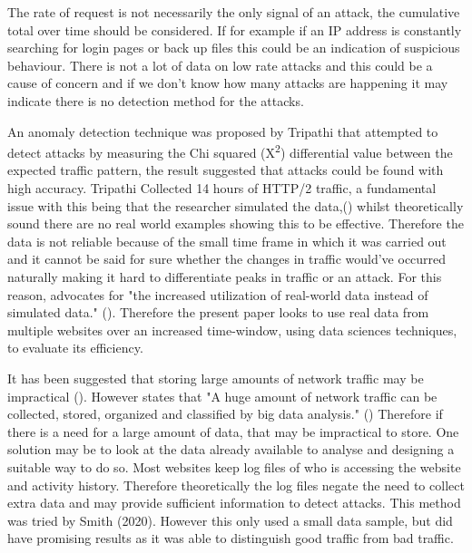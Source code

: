 The rate of request is not necessarily the only signal of an attack, the cumulative total over time should be considered. If for example if an IP address is constantly searching for login pages or back up files this could be an indication of suspicious behaviour. There is not a lot of data on low rate attacks and this could be a cause of concern and if we don't know how many attacks are happening it may indicate there is no detection method for the attacks. 

 
An anomaly detection technique was proposed by Tripathi that attempted to detect attacks by measuring the Chi squared (X\textsuperscript{\small2}) differential value between the expected traffic pattern, the result suggested that attacks could be found with high accuracy. Tripathi Collected 14 hours of HTTP/2 traffic, a fundamental issue with this being that the researcher simulated the data,(\cite{tripathi2018slow}) whilst theoretically sound there are no real world examples showing this to be effective. Therefore the data is not reliable because of the small time frame in which it was carried out and  it cannot be said for sure whether the changes in traffic would've occurred naturally making it hard to differentiate peaks in traffic or an attack. For this reason, \citeauthor{8500383} advocates for "the increased utilization of real-world data instead of simulated data." (\cite{8500383}). Therefore the present paper looks to use real data from multiple websites over an increased time-window, using data sciences techniques, to evaluate its efficiency. 

It has been suggested that storing large amounts of network traffic may be impractical (\cite{staniford2002practical}). However \citeauthor{9016229} states that  "A huge amount of network traffic can be collected, stored, organized and classified by big data analysis." (\cite{9016229}) Therefore if there is a need for a large amount of data, that may be impractical to store. One solution may be to look at the data already available to analyse and designing a suitable way to do so. Most websites keep log files of who is accessing the website and activity history. Therefore theoretically the log files negate the need to collect extra data and may provide sufficient information to detect attacks. This method was tried by Smith (2020). However this only used a small data sample, but did have promising results as it was able to distinguish good traffic from bad traffic. 

